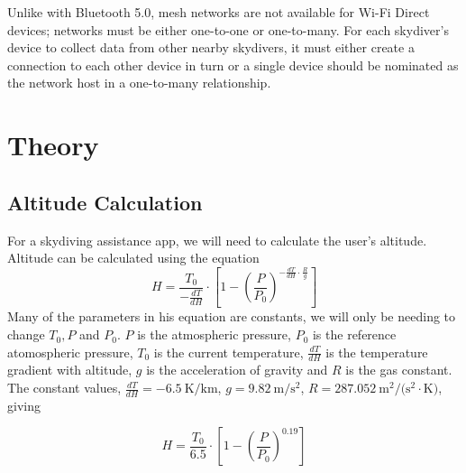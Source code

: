 \documentclass[11pt, a4paper, twocolumn]{article}
\begin{document}
Unlike with Bluetooth 5.0, mesh networks are not available for Wi-Fi Direct devices; networks must be either one-to-one or one-to-many. For each skydiver's device to collect data from other nearby skydivers, it must either create a connection to each other device in turn or a single device should be nominated as the network host in a one-to-many relationship.

\section{Theory}\label{sec:theory} %

\subsection{Altitude Calculation} %
For a skydiving assistance app, we will need to calculate the user's altitude. Altitude can be calculated using the equation
\begin{equation}
    H = \frac{T_0} {-\frac{dT}{dH}} \cdot \left[1-{\left(\frac{P} {P_0}\right)}^{-\frac{dT} {dH} \cdot \frac{R} {g}}\right]
\end{equation}
Many of the parameters in his equation are constants, we will only be needing to change $T_0, P$ and $P_0$. $P$ is the atmospheric pressure, $P_0$ is the reference atomospheric pressure, $T_0$ is the current temperature, $\frac{dT}{dH}$ is the temperature gradient with altitude, $g$ is the acceleration of gravity and $R$ is the gas constant. The constant values, $\frac{dT}{dH} = \SI{-6.5}{\kelvin\per\kilo\metre}$, $g = \SI{9.82}{\metre\per\second\squared}$, $R = \SI{287.052}{\metre\squared\per(\second\squared\cdot\kelvin)}$, giving~\cite{he_atmospheric_2012}

\begin{equation}
    H = \frac{T_0} {6.5} \cdot \left[1-{\left(\frac{P} {P_0}\right)}^{0.19}\right]
\end{equation}

\end{document}
